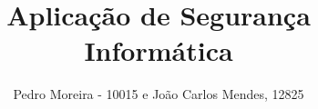 \documentclass[10pt,journal,cspaper,compsoc]{IEEEtran}
\begin{document}
%
\title{Aplicação de Segurança Informática}
%
%
%
%

\author{Pedro Moreira - 10015 e João Carlos Mendes, 12825}

% 
%
\end{document}
